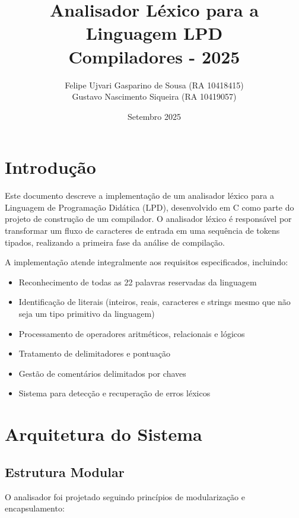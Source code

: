 \documentclass[12pt]{article}
\title{Analisador Léxico para a Linguagem LPD\\
\large Compiladores - 2025}
\author{Felipe Ujvari Gasparino de Sousa (RA 10418415)\\Gustavo Nascimento Siqueira (RA 10419057)}
\date{Setembro 2025}
\begin{document}
\maketitle

\section{Introdução}
Este documento descreve a implementação de um analisador léxico para a Linguagem de Programação Didática (LPD), desenvolvido em C como parte do projeto de construção de um compilador. O analisador léxico é responsável por transformar um fluxo de caracteres de entrada em uma sequência de tokens tipados, realizando a primeira fase da análise de compilação.

A implementação atende integralmente aos requisitos especificados, incluindo:
\begin{itemize}[noitemsep]
    \item Reconhecimento de todas as 22 palavras reservadas da linguagem
    \item Identificação de literais (inteiros, reais, caracteres e strings mesmo que não seja um tipo primitivo da linguagem)
    \item Processamento de operadores aritméticos, relacionais e lógicos
    \item Tratamento de delimitadores e pontuação
    \item Gestão de comentários delimitados por chaves
    \item Sistema para detecção e recuperação de erros léxicos
\end{itemize}

\section{Arquitetura do Sistema}

\subsection{Estrutura Modular}
O analisador foi projetado seguindo princípios de modularização e encapsulamento:
\end{document}

